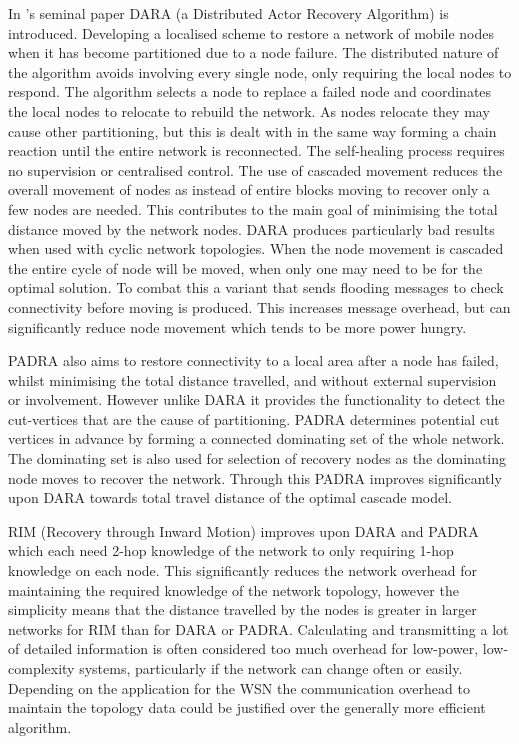 \documentclass[authoryearcitations]{UoYCSproject}
\begin{document}
In \citet{Abbasi2007}'s seminal paper DARA (a Distributed Actor Recovery Algorithm) is introduced. Developing a localised scheme to restore a network of mobile nodes when it has become partitioned due to a node failure. The distributed nature of the algorithm avoids involving every single node, only requiring the local nodes to respond. The algorithm selects a node to replace a failed node and coordinates the local nodes to relocate to rebuild the network. As nodes relocate they may cause other partitioning, but this is dealt with in the same way forming a chain reaction until the entire network is reconnected. The self-healing process requires no supervision or centralised control. The use of cascaded movement reduces the overall movement of nodes as instead of entire blocks moving to recover only a few nodes are needed. This contributes to the main goal of minimising the total distance moved by the network nodes.
DARA produces particularly bad results when used with cyclic network topologies. When the node movement is cascaded the entire cycle of node will be moved, when only one may need to be for the optimal solution. To combat this a variant that sends flooding messages to check connectivity before moving is produced. This increases message overhead, but can significantly reduce node movement which tends to be more power hungry.

PADRA \citep{Akkaya2008} also aims to restore connectivity to a local area after a node has failed, whilst minimising the total distance travelled, and without external supervision or involvement. However unlike DARA it provides the functionality to detect the cut-vertices that are the cause of partitioning. PADRA determines potential cut vertices in advance by forming a connected dominating set of the whole network. The dominating set is also used for selection of recovery nodes as the dominating node moves to recover the network. Through this PADRA improves significantly upon DARA towards total travel distance of the optimal cascade model.

RIM (Recovery through Inward Motion) \citep{Younis2010} improves upon DARA and PADRA which each need 2-hop knowledge of the network to only requiring 1-hop knowledge on each node. This significantly reduces the network overhead for maintaining the required knowledge of the network topology, however the simplicity means that the distance travelled by the nodes is greater in larger networks for RIM than for DARA or PADRA. Calculating and transmitting a lot of detailed information is often considered too much overhead for low-power, low-complexity systems, particularly if the network can change often or easily. Depending on the application for the WSN the communication overhead to maintain the topology data could be justified over the generally more efficient algorithm.
\end{document}

